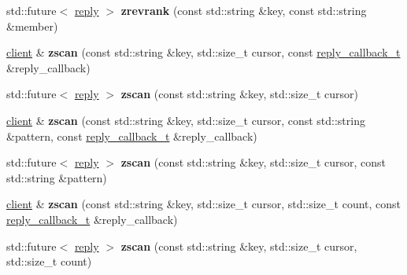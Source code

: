 \begin{DoxyCompactItemize}
std\+::future$<$ \mbox{\hyperlink{classcpp__redis_1_1reply}{reply}} $>$ {\bfseries zrevrank} (const std\+::string \&key, const std\+::string \&member)
\item 
\mbox{\label{classcpp__redis_1_1client_a2f62f5c0522752d22365e3a8cc0872aa}} 
\mbox{\hyperlink{classcpp__redis_1_1client}{client}} \& {\bfseries zscan} (const std\+::string \&key, std\+::size\+\_\+t cursor, const \mbox{\hyperlink{classcpp__redis_1_1client_af7a65eb21aa25230bfbb0b0203c4fc04}{reply\+\_\+callback\+\_\+t}} \&reply\+\_\+callback)
\item 
\mbox{\label{classcpp__redis_1_1client_a68320f3e1279960c0eb4b68154738ca1}} 
std\+::future$<$ \mbox{\hyperlink{classcpp__redis_1_1reply}{reply}} $>$ {\bfseries zscan} (const std\+::string \&key, std\+::size\+\_\+t cursor)
\item 
\mbox{\label{classcpp__redis_1_1client_a06a2ef38d19e19af5e6f57dce543ecc4}} 
\mbox{\hyperlink{classcpp__redis_1_1client}{client}} \& {\bfseries zscan} (const std\+::string \&key, std\+::size\+\_\+t cursor, const std\+::string \&pattern, const \mbox{\hyperlink{classcpp__redis_1_1client_af7a65eb21aa25230bfbb0b0203c4fc04}{reply\+\_\+callback\+\_\+t}} \&reply\+\_\+callback)
\item 
\mbox{\label{classcpp__redis_1_1client_afca988f95912f1f72f1d6d444c14c427}} 
std\+::future$<$ \mbox{\hyperlink{classcpp__redis_1_1reply}{reply}} $>$ {\bfseries zscan} (const std\+::string \&key, std\+::size\+\_\+t cursor, const std\+::string \&pattern)
\item 
\mbox{\label{classcpp__redis_1_1client_a4044c08822501d939b1b2a95b2431dd0}} 
\mbox{\hyperlink{classcpp__redis_1_1client}{client}} \& {\bfseries zscan} (const std\+::string \&key, std\+::size\+\_\+t cursor, std\+::size\+\_\+t count, const \mbox{\hyperlink{classcpp__redis_1_1client_af7a65eb21aa25230bfbb0b0203c4fc04}{reply\+\_\+callback\+\_\+t}} \&reply\+\_\+callback)
\item 
\mbox{\label{classcpp__redis_1_1client_acfa7881d57ccdf7a0fff34eaf43feb56}} 
std\+::future$<$ \mbox{\hyperlink{classcpp__redis_1_1reply}{reply}} $>$ {\bfseries zscan} (const std\+::string \&key, std\+::size\+\_\+t cursor, std\+::size\+\_\+t count)

\end{DoxyCompactItemize}
